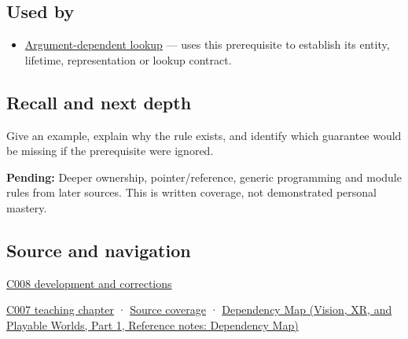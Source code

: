 \subsection{Used by}\label{appendix-b12b31759da1-used-by}

\hypertarget{appendix-b12b31759da1-used-by}{}

\begin{itemize}
\tightlist
\item
  \hyperref[appendix-7863714aa97f]{Argument-dependent lookup} --- uses this prerequisite to establish its entity, lifetime, representation or lookup contract.
\end{itemize}

\subsection{Recall and next depth}\label{appendix-b12b31759da1-recall-and-next-depth}

\hypertarget{appendix-b12b31759da1-recall-and-next-depth}{}

Give an example, explain why the rule exists, and identify which guarantee would be missing if the prerequisite were ignored.

\textbf{Pending:} Deeper ownership, pointer/reference, generic programming and module rules from later sources. This is written coverage, not demonstrated personal mastery.

\subsection{Source and navigation}\label{appendix-b12b31759da1-source-and-navigation}

\hypertarget{appendix-b12b31759da1-source-and-navigation}{}

\hyperref[appendix-fd090d982a15-m008---parts-113-126]{C008 development and corrections}

\hyperref[01-foundations-i-ch002-a-spelling-needs-a-place-and-a-meaning]{C007 teaching chapter} · \hyperref[appendix-fd090d982a15-m007---parts-101-112]{Source coverage} · \href{../07-Vision-XR-and-Playable-Worlds-P01/main.pdf\#nameddest=appendix-4ad47bdd269a}{Dependency Map (Vision, XR, and Playable Worlds, Part 1, Reference notes: Dependency Map)}
